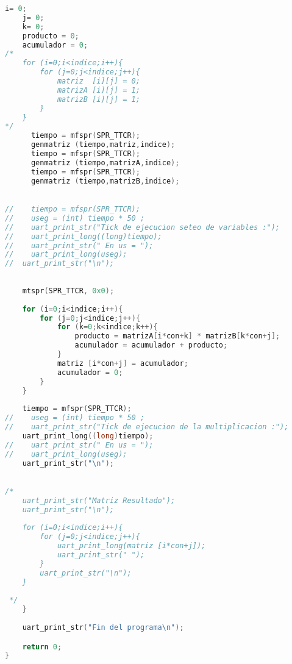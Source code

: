 \begin{lstlisting}[language=C,frame=single]
    i= 0;
    j= 0;
    k= 0;
    producto = 0;
    acumulador = 0;
/*
    for (i=0;i<indice;i++){
		for (j=0;j<indice;j++){
			matriz  [i][j] = 0;
			matrizA [i][j] = 1;
			matrizB [i][j] = 1;
		}
	}
*/
      tiempo = mfspr(SPR_TTCR);
      genmatriz (tiempo,matriz,indice);
      tiempo = mfspr(SPR_TTCR);
      genmatriz (tiempo,matrizA,indice);
      tiempo = mfspr(SPR_TTCR);
      genmatriz (tiempo,matrizB,indice);
    

//    tiempo = mfspr(SPR_TTCR);
//    useg = (int) tiempo * 50 ; 
//    uart_print_str("Tick de ejecucion seteo de variables :");
//    uart_print_long((long)tiempo);
//    uart_print_str(" En us = ");
//    uart_print_long(useg);
// 	uart_print_str("\n");
 	 
 
	mtspr(SPR_TTCR, 0x0);
    
	for (i=0;i<indice;i++){
		for (j=0;j<indice;j++){
			for (k=0;k<indice;k++){
				producto = matrizA[i*con+k] * matrizB[k*con+j];
				acumulador = acumulador + producto;
			}
			matriz [i*con+j] = acumulador;
			acumulador = 0;
		}	
	}
    
    tiempo = mfspr(SPR_TTCR);
//    useg = (int) tiempo * 50 ;
//    uart_print_str("Tick de ejecucion de la multiplicacion :");
    uart_print_long((long)tiempo);
//    uart_print_str(" En us = ");
//    uart_print_long(useg);
    uart_print_str("\n");   
    

/*
    uart_print_str("Matriz Resultado");   
    uart_print_str("\n");   
    
    for (i=0;i<indice;i++){
		for (j=0;j<indice;j++){
			uart_print_long(matriz [i*con+j]);
			uart_print_str(" ");
		}
		uart_print_str("\n");
	}
  
 */  
    } 
  
    uart_print_str("Fin del programa\n");

    return 0;
}
\end{lstlisting}

